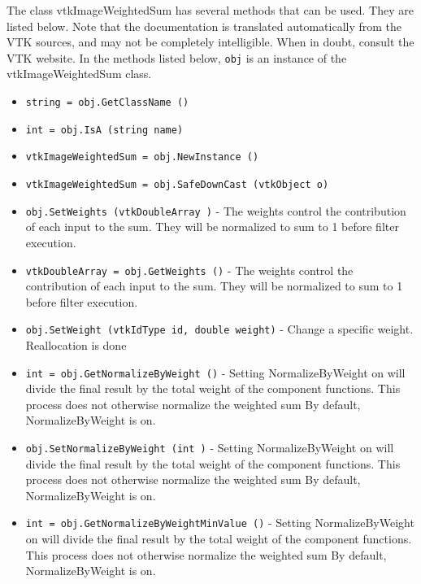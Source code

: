 The class vtkImageWeightedSum has several methods that can be used.
  They are listed below.
Note that the documentation is translated automatically from the VTK sources,
and may not be completely intelligible.  When in doubt, consult the VTK website.
In the methods listed below, \verb|obj| is an instance of the vtkImageWeightedSum class.
\begin{itemize}
\item  \verb|string = obj.GetClassName ()|

\item  \verb|int = obj.IsA (string name)|

\item  \verb|vtkImageWeightedSum = obj.NewInstance ()|

\item  \verb|vtkImageWeightedSum = obj.SafeDownCast (vtkObject o)|

\item  \verb|obj.SetWeights (vtkDoubleArray )| -  The weights control the contribution of each input to the sum.
 They will be normalized to sum to 1 before filter execution.

\item  \verb|vtkDoubleArray = obj.GetWeights ()| -  The weights control the contribution of each input to the sum.
 They will be normalized to sum to 1 before filter execution.

\item  \verb|obj.SetWeight (vtkIdType id, double weight)| -  Change a specific weight. Reallocation is done

\item  \verb|int = obj.GetNormalizeByWeight ()| -  Setting NormalizeByWeight on will divide the
 final result by the total weight of the component functions.
 This process does not otherwise normalize the weighted sum
 By default, NormalizeByWeight is on.

\item  \verb|obj.SetNormalizeByWeight (int )| -  Setting NormalizeByWeight on will divide the
 final result by the total weight of the component functions.
 This process does not otherwise normalize the weighted sum
 By default, NormalizeByWeight is on.

\item  \verb|int = obj.GetNormalizeByWeightMinValue ()| -  Setting NormalizeByWeight on will divide the
 final result by the total weight of the component functions.
 This process does not otherwise normalize the weighted sum
 By default, NormalizeByWeight is on.


\end{itemize}

